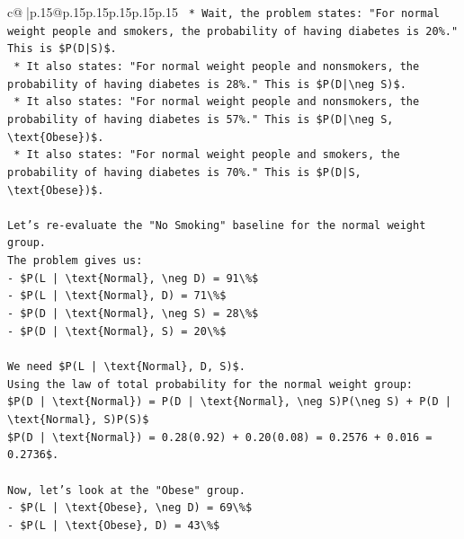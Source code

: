\documentclass{article}
\begin{document}
{\begin{supertabular}{c@{$\;$}|p{.15\linewidth}@{}p{.15\linewidth}p{.15\linewidth}p{.15\linewidth}p{.15\linewidth}p{.15\linewidth}}
{{{\texttt{    *   Wait, the problem states: "For normal weight people and smokers, the probability of having diabetes is 20\%." This is \$P(D|S)\$.} \\
\texttt{    *   It also states: "For normal weight people and nonsmokers, the probability of having diabetes is 28\%." This is \$P(D|\textbackslash{}neg S)\$.} \\
\texttt{    *   It also states: "For normal weight people and nonsmokers, the probability of having diabetes is 57\%." This is \$P(D|\textbackslash{}neg S, \textbackslash{}text\{Obese\})\$.} \\
\texttt{    *   It also states: "For normal weight people and smokers, the probability of having diabetes is 70\%." This is \$P(D|S, \textbackslash{}text\{Obese\})\$.} \\
\\ 
\texttt{Let's re{-}evaluate the "No Smoking" baseline for the normal weight group.} \\
\texttt{The problem gives us:} \\
\texttt{{-} \$P(L | \textbackslash{}text\{Normal\}, \textbackslash{}neg D) = 91\textbackslash{}\%\$} \\
\texttt{{-} \$P(L | \textbackslash{}text\{Normal\}, D) = 71\textbackslash{}\%\$} \\
\texttt{{-} \$P(D | \textbackslash{}text\{Normal\}, \textbackslash{}neg S) = 28\textbackslash{}\%\$} \\
\texttt{{-} \$P(D | \textbackslash{}text\{Normal\}, S) = 20\textbackslash{}\%\$} \\
\\ 
\texttt{We need \$P(L | \textbackslash{}text\{Normal\}, D, S)\$.} \\
\texttt{Using the law of total probability for the normal weight group:} \\
\texttt{\$P(D | \textbackslash{}text\{Normal\}) = P(D | \textbackslash{}text\{Normal\}, \textbackslash{}neg S)P(\textbackslash{}neg S) + P(D | \textbackslash{}text\{Normal\}, S)P(S)\$} \\
\texttt{\$P(D | \textbackslash{}text\{Normal\}) = 0.28(0.92) + 0.20(0.08) = 0.2576 + 0.016 = 0.2736\$.} \\
\\ 
\texttt{Now, let's look at the "Obese" group.} \\
\texttt{{-} \$P(L | \textbackslash{}text\{Obese\}, \textbackslash{}neg D) = 69\textbackslash{}\%\$} \\
\texttt{{-} \$P(L | \textbackslash{}text\{Obese\}, D) = 43\textbackslash{}\%\$} \\
}}}
\end{supertabular}}
\end{document}
